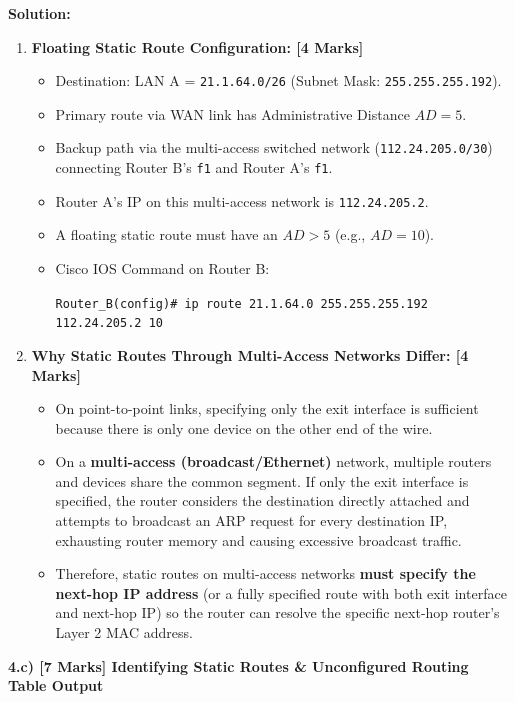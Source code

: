 \documentclass[11pt,a4paper]{article}
\begin{document}
\textbf{Solution:}
\begin{enumerate}
    \item \textbf{Floating Static Route Configuration: [4 Marks]}
    \begin{itemize}
        \item Destination: LAN A = \texttt{21.1.64.0/26} (Subnet Mask: \texttt{255.255.255.192}).
        \item Primary route via WAN link has Administrative Distance $AD = 5$.
        \item Backup path via the multi-access switched network (\texttt{112.24.205.0/30}) connecting Router B's \texttt{f1} and Router A's \texttt{f1}.
        \item Router A's IP on this multi-access network is \texttt{112.24.205.2}.
        \item A floating static route must have an $AD > 5$ (e.g., $AD = 10$).
        \item Cisco IOS Command on Router B:
        \begin{center}
            \texttt{Router\_B(config)\# ip route 21.1.64.0 255.255.255.192 112.24.205.2 10}
        \end{center}
    \end{itemize}

    \item \textbf{Why Static Routes Through Multi-Access Networks Differ: [4 Marks]}
    \begin{itemize}
        \item On point-to-point links, specifying only the exit interface is sufficient because there is only one device on the other end of the wire.
        \item On a \textbf{multi-access (broadcast/Ethernet)} network, multiple routers and devices share the common segment. If only the exit interface is specified, the router considers the destination directly attached and attempts to broadcast an ARP request for every destination IP, exhausting router memory and causing excessive broadcast traffic.
        \item Therefore, static routes on multi-access networks \textbf{must specify the next-hop IP address} (or a fully specified route with both exit interface and next-hop IP) so the router can resolve the specific next-hop router's Layer 2 MAC address.
    \end{itemize}
\end{enumerate}

\vspace{0.2cm}
\textbf{4.c) [7 Marks] Identifying Static Routes \& Unconfigured Routing Table Output}
\end{document}
